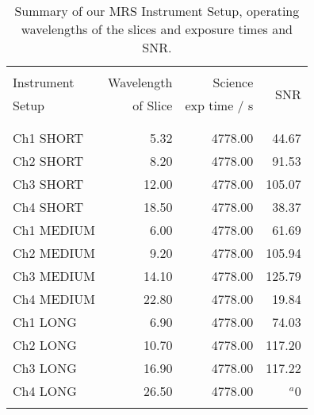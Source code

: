 \begin{table}
\begin{center}
\begin{tabular}{|| l | r | r | r ||}
  \hline\hline
  &&& \\
  Instrument 	& 	Wavelength  & Science          & \multirow{ 2}{*}{SNR} \\
  Setup	        &    	       of Slice  & exp time / s  &        \\
  &&& \\
  \hline
  &&& \\
 Ch1 SHORT & 5.32  &  4778.00 & 44.67 \\
 Ch2 SHORT & 8.20  &  4778.00 & 91.53 \\
 Ch3 SHORT & 12.00  &  4778.00 & 105.07 \\
 Ch4 SHORT & 18.50 &  4778.00 & 38.37 \\
 Ch1 MEDIUM & 6.00  &  4778.00 & 61.69 \\
 Ch2 MEDIUM & 9.20  &  4778.00 & 105.94 \\
 Ch3 MEDIUM & 14.10  &  4778.00 & 125.79 \\
 Ch4 MEDIUM & 22.80  &  4778.00 & 19.84 \\
 Ch1 LONG & 6.90  &  4778.00 & 74.03 \\
 Ch2 LONG & 10.70  &  4778.00 & 117.20 \\
 Ch3 LONG & 16.90  &  4778.00 & 117.22 \\
 Ch4 LONG & 26.50  &  4778.00 & $^{a}$0 \\
  &&& \\
  \hline\hline
\end{tabular}
\caption{Summary of our MRS Instrument Setup, 
  operating wavelengths of the slices and exposure 
  times and SNR. 
}
\label{tab:ETC_calcs} 
\end{center}
\end{table}

